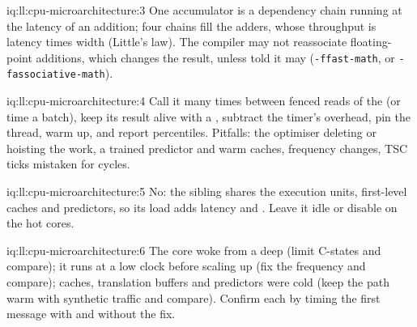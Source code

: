 \begin{solution}{iq:ll:cpu-microarchitecture:3}
One accumulator is a dependency chain running at the latency of an addition; four chains fill the adders, whose
throughput is latency times width (Little's law). The compiler may not reassociate floating-point additions, which
changes the result, unless told it may (\texttt{-ffast-math}, or \texttt{-fassociative-math}).
\end{solution}

\begin{solution}{iq:ll:cpu-microarchitecture:4}
Call it many times between fenced reads of the  (or time a batch), keep its result alive with a
, subtract the timer's overhead, pin the thread, warm up, and report percentiles. Pitfalls: the
optimiser deleting or hoisting the work, a trained predictor and warm caches, frequency changes, TSC ticks mistaken for
cycles.
\end{solution}

\begin{solution}{iq:ll:cpu-microarchitecture:5}
No: the sibling shares the execution units, first-level caches and predictors, so its load adds latency and .
Leave it idle or disable  on the hot cores.
\end{solution}

\begin{solution}{iq:ll:cpu-microarchitecture:6}
The core woke from a deep  (limit C-states and compare); it runs at a low clock before scaling up (fix the
frequency and compare); caches, translation buffers and predictors were cold (keep the path warm with synthetic
traffic and compare). Confirm each by timing the first message with and without the fix.
\end{solution}

